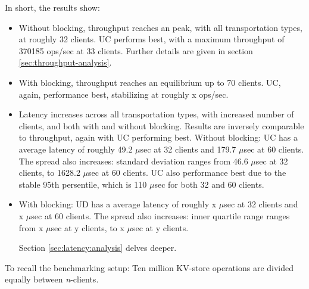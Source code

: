 In short, the results show:
\begin{itemize}
    \item Without blocking, throughput reaches an peak, with all transportation types, at roughly 32 clients.
    UC performs best, with a maximum throughput of 370185 ops/sec at 33 clients.
    Further details are given in section \ref{sec:throughput-analysis}.
    \item With blocking, throughput reaches an equilibrium up to 70 clients.
    UC, again, performance best, stabilizing at roughly x ops/sec.
    \item Latency increases across all transportation types, with increased number of clients, and both with and without blocking.
    Results are inversely comparable to throughput, again with UC performing best.
    Without blocking: UC has a average latency of roughly 49.2 $\mu$sec at 32 clients and 179.7 $\mu$sec at 60 clients.
    The spread also increases: standard deviation ranges from 46.6 $\mu$sec at 32 clients, to 1628.2 $\mu$sec at 60 clients.
    UC also performance best due to the stable 95th persentile, which is 110 $\mu$sec for both 32 and 60 clients.
    \item
    With blocking: UD has a average latency of roughly x $\mu$sec at 32 clients and x $\mu$sec at 60 clients.
    The spread also increases: inner quartile range ranges from x $\mu$sec at y clients, to x $\mu$sec at y clients.

    Section \ref{sec:latency:analysis} delves deeper.
\end{itemize}

To recall the benchmarking setup:
Ten million KV-store operations are divided equally between \textit{n}-clients.

